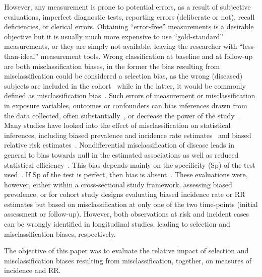However, any measurement is prone to potential errors, as a result of subjective
evaluations, imperfect diagnostic tests, reporting errors (deliberate or not),
recall deficiencies, or clerical errors.
Obtaining ``error-free'' measurements is a desirable objective but it is
usually much more expensive to use ``gold-standard'' measurements, or they
are simply not available, leaving the researcher with ``less-than-ideal''
measurement tools.
Wrong classification at baseline and at follow-up are both misclassification
biases, in the former the bias resulting from misclassification could be
considered a selection bias, as the wrong (diseased) subjects are included in
the cohort~\citep{Rothman2012} while in the latter, it would be commonly defined
as misclassification bias~\citep{Delgado-Rodriguez2004}.
Such errors of measurement or misclassification in exposure variables, outcomes
or confounders can bias inferences drawn from the data collected, often
substantially~\citep{Quade1980}, or decrease the power of the
study~\citep{Bross1954,WHITE_1986}.
Many studies have looked into the effect of misclassification on statistical
inferences, including biased prevalence and incidence rate
estimates~\citep{Rogan1978,Quade1980} and biased relative risk
estimates~\citep{Barron1977,Greenland1980}.
Nondifferential misclassification of disease leads in general to bias towards
null in the estimated associations as well as reduced statistical
efficiency~\citep{Bross1954,Barron1977,Copeland1977}.
This bias depends mainly on the specificity (Sp) of the test
used~\citep{Copeland1977}.
If Sp of the test is perfect, then bias is absent~\citep{Poole1985}.
These evaluations were, however, either within a cross-sectional study
framework, assessing biased prevalence, or for cohort study designs evaluating
biased incidence rate or RR estimates but based on misclassification at only one
of the two time-points (initial assessment or follow-up).
However, both observations at risk and incident cases can be wrongly identified
in longitudinal studies, leading to selection and misclassification biases,
respectively.

The objective of this paper was to evaluate the relative impact of selection and
misclassification biases resulting from misclassification, together, on measures
of incidence and RR.


